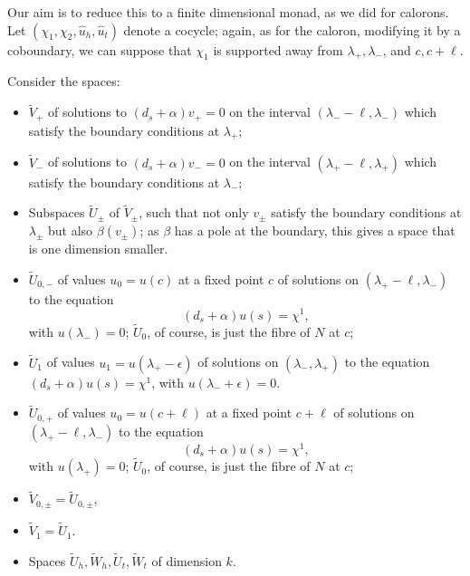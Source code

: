 \documentclass[12pt]{article}
\theoremstyle{definition}
\theoremstyle{remark}
\numberwithin{theorem}{section}
\begin{document}
Our aim is to reduce this to a finite dimensional monad, as we did for calorons. Let $(\chi_1, \chi_2, \widehat u_h, \widehat u_t)$ denote a cocycle; again, as for the caloron, modifying it by a coboundary, we can suppose that $\chi_1$ is supported away from $\lambda_+, \lambda_-$, and $c, c+\ell$.

 
Consider the spaces:
\begin{itemize}
\item $\widetilde V_+$ of solutions to $ (d_s  +  \alpha)v_+ = 0$  on the interval $(\lambda_--\ell,\lambda_-)$ which satisfy the boundary conditions at $\lambda_+$;
\item  $\widetilde V_-$  of solutions to $ (d_s  +  \alpha)v_- = 0$  on the interval $(\lambda_+ - \ell,\lambda_+ )$ which satisfy the boundary conditions at $\lambda_-$;
\item Subspaces $\widetilde  U_\pm$ of $\widetilde  V_\pm$, such that not only $v_\pm$ satisfy the boundary conditions at $\lambda_\pm$ but also $\beta(v_\pm)$; as $\beta$ has a pole at the boundary, this gives a space that is one dimension smaller.
\item $\widetilde U_{0,-}$ of values $u_0 = u(c)$  at   a fixed point $c $ of solutions on $(\lambda_+ -\ell , \lambda_-)$ to the 
equation 
\begin{equation}(d_s  +  \alpha)u (s) = \chi^1,\label{chioneTN}\end{equation}  
with $u(\lambda_-) =0$; $\widetilde U_0$, of course, is just the fibre of $N$ at $c$;
\item $\widetilde U_1$ of values $u_1 = u (\lambda_+-\epsilon)$ of  solutions  on $(\lambda_-, \lambda_+)$ to the 
equation $(d_s  +  \alpha)u(s) = \chi^1 $, with $u(\lambda_-+\epsilon) =0$. 
\item $\widetilde U_{0,+}$ of values $u_0 = u(c+\ell)$  at   a fixed point $c+\ell $    of solutions on $(\lambda_+ -\ell , \lambda_-)$ to the 
equation 
\begin{equation}(d_s  +  \alpha)u (s) = \chi^1,\label{chitwoTN}\end{equation}  
with $u(\lambda_+) =0$; $\widetilde U_0$, of course, is just the fibre of $N$ at $c$;
\item $\widetilde V_{0,\pm} =\widetilde  U_{0,\pm}$, 
\item $\widetilde V_1 =\widetilde  U_1$.
 \item Spaces $\widetilde  U_h, \widetilde  W_h, \widetilde  U_t, \widetilde  W_t$ of dimension $k$.
\end{itemize}
\end{document}
